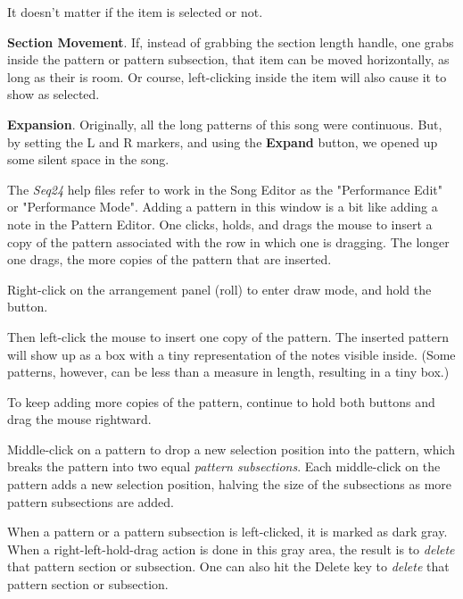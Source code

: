 \begin{enumber}
         It doesn't matter if the item is selected or not.
      \item \textbf{Section Movement}.
         If, instead of grabbing the section length handle, one grabs inside
         the pattern or pattern subsection, that item can be moved
         horizontally, as long as their is room.  Or course, left-clicking
         inside the item will also cause it to show as selected.
      \item \textbf{Expansion}.
         Originally, all the long patterns of this song were continuous.
         But, by setting the L and R markers, and using the \textbf{Expand}
         button, we opened up some silent space in the song.
   \end{enumber}

   The \textsl{Seq24} help files refer to work in the Song Editor as the
   "Performance Edit" or "Performance Mode".  Adding a pattern in this
   window is a bit like adding a note in the Pattern Editor.
   One clicks, holds, and drags the mouse to insert a copy of the pattern
   associated with the row in which one is dragging.  The longer one drags,
   the more copies of the pattern that are inserted.

	Right-click on the arrangement panel (roll) to enter
   draw mode, and hold the button.

   Then left-click the mouse to insert one copy of the pattern.  The
   inserted pattern will show up as a box with a tiny representation of the
   notes visible inside.  (Some patterns, however, can be less than a
   measure in length, resulting in a tiny box.)

   To keep adding more copies of the pattern, continue to hold both buttons
   and drag the mouse rightward.

   Middle-click on a pattern to drop a new selection position into the
   pattern,
   which breaks the pattern into two equal \textsl{pattern subsections}.
   Each middle-click on the pattern adds a new selection position,
   halving the size of the subsections as more pattern subsections are
   added.

   When a pattern or a pattern subsection is left-clicked, it is marked as
   dark gray.
   When a right-left-hold-drag action is done in this gray area, the result
   is to \textsl{delete} that pattern section or subsection.
   One can also hit the Delete key to \textsl{delete} that pattern section
   or subsection.

